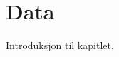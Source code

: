 \documentclass[../../main.tex]{subfiles}
\begin{document}

\chapter{Data}

Introduksjon til kapitlet.

\end{document}
